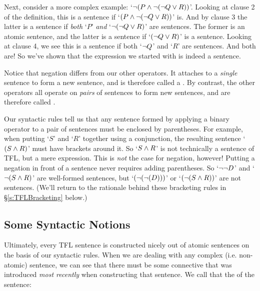 Next, consider a more complex example: `$\neg (P \wedge \neg (\neg Q \vee R))$'. Looking at clause 2 of the definition, this is a sentence if `$(P \wedge \neg (\neg Q \vee R))$' is. And by clause 3 the latter is a sentence if \emph{both} `$P$' \emph{and} `$\neg (\neg Q \vee R)$' are sentences. The former is an atomic sentence, and the latter is a sentence if `$(\neg Q \vee R)$' is a sentence. Looking at clause 4, we see this is a sentence if both `$\neg Q$' and `$R$' are sentences. And both are!  So we've shown that the expression we started with is indeed a sentence.

Notice that negation differs from our other operators.  It attaches to a \emph{single} sentence to form a new sentence, and is therefore called a .  By contrast, the other operators all operate on \emph{pairs} of sentences to form new sentences, and are therefore called .

Our syntactic rules tell us that any sentence formed by applying a binary operator to a pair of sentences must be enclosed by parentheses.  For example, when putting `$S$' and `$R$' together using a conjunction, the resulting sentence `$(S \wedge R)$' must have brackets around it.  So `$S \wedge R$' is not technically a sentence of TFL, but a mere expression.  This is \emph{not} the case for negation, however!  Putting a negation in front of a sentence never requires adding parentheses.  So `$\neg \neg D$' and `$\neg (S \wedge R)$' are well-formed sentences, but `$(\neg (\neg (D)))$' or `$(\neg (S \wedge R))$' are not sentences.  (We'll return to the rationale behind these bracketing rules in \S \ref{s:TFLBracketing} below.)

\subsection{Some Syntactic Notions}\label{s:TFLSyntacticNotions}



Ultimately, every TFL sentence is constructed nicely out of atomic sentences on the basis of our syntactic rules. When we are dealing with any complex (i.e. non-atomic) sentence, we can see that there must be some connective that was introduced \emph{most recently} when constructing that sentence. We call that the  of the sentence:


